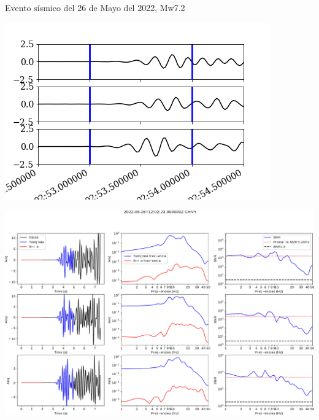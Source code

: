 \documentclass{beamer}
\begin{document}
\begin{frame}
 {Evento sísmico del 26 de Mayo del 2022, Mw7.2}
 
 \begin{minipage}{0.9\linewidth}
  \centering \includegraphics[width=0.9\linewidth]{images/zoom1_ventanas.png}
 \end{minipage}
  
\end{frame}






\begin{frame}
 
 \begin{minipage}{1\linewidth}
  \includegraphics[width=1\linewidth]{images/snr_event_0_CHVY}
 \end{minipage}
 
\end{frame}
\end{document}
